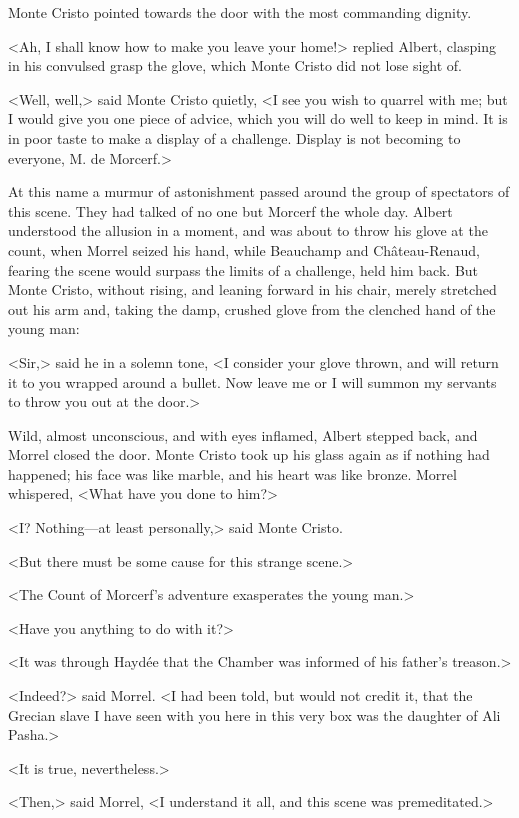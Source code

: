  Monte Cristo pointed towards the door with the most commanding dignity. 

 <Ah, I shall know how to make you leave your home!> replied Albert, clasping in his convulsed grasp the glove, which Monte Cristo did not lose sight of. 

 <Well, well,> said Monte Cristo quietly, <I see you wish to quarrel with me; but I would give you one piece of advice, which you will do well to keep in mind. It is in poor taste to make a display of a challenge. Display is not becoming to everyone, M. de Morcerf.> 

 At this name a murmur of astonishment passed around the group of spectators of this scene. They had talked of no one but Morcerf the whole day. Albert understood the allusion in a moment, and was about to throw his glove at the count, when Morrel seized his hand, while Beauchamp and Château-Renaud, fearing the scene would surpass the limits of a challenge, held him back. But Monte Cristo, without rising, and leaning forward in his chair, merely stretched out his arm and, taking the damp, crushed glove from the clenched hand of the young man: 

 <Sir,> said he in a solemn tone, <I consider your glove thrown, and will return it to you wrapped around a bullet. Now leave me or I will summon my servants to throw you out at the door.> 

 Wild, almost unconscious, and with eyes inflamed, Albert stepped back, and Morrel closed the door. Monte Cristo took up his glass again as if nothing had happened; his face was like marble, and his heart was like bronze. Morrel whispered, <What have you done to him?> 

 <I? Nothing—at least personally,> said Monte Cristo. 

 <But there must be some cause for this strange scene.> 

 <The Count of Morcerf's adventure exasperates the young man.> 

 <Have you anything to do with it?> 

 <It was through Haydée that the Chamber was informed of his father's treason.> 

 <Indeed?> said Morrel. <I had been told, but would not credit it, that the Grecian slave I have seen with you here in this very box was the daughter of Ali Pasha.> 

 <It is true, nevertheless.> 

 <Then,> said Morrel, <I understand it all, and this scene was premeditated.> 

